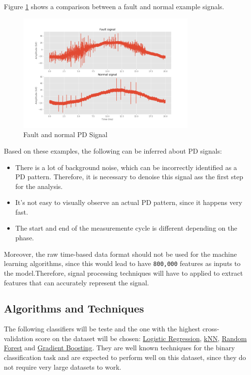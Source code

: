 \documentclass[11pt]{article}
\providecommand{\tightlist}{%
      \setlength{\itemsep}{0pt}\setlength{\parskip}{0pt}}
\begin{document}
Figure \ref{fig:pdsignal_fd} shows a comparison between a fault and normal example
signals. 

\begin{figure}[h!]
	\centering
	\includegraphics[width=0.8\textwidth]{signal_fault_normal_raw.png}
	\caption{Fault and normal PD Signal}
	\label{fig:pdsignal_fd}
\end{figure}

Based on these examples, the following can be inferred about PD signals:

\begin{itemize}
\tightlist
\item
  There is a lot of background noise, which can be incorrectly
  identified as a PD pattern. Therefore, it is necessary to denoise this
  signal ass the first step for the analysis.
\item
  It's not easy to visually observe an actual PD pattern, since it
  happens very fast.
\item
  The start and end of the measuremente cycle is different depending on
  the phase.
\end{itemize}

Moreover, the raw time-based data format should not be used for the
machine learning algorithms, since this would lead to have
\texttt{800,000} features as inputs to the model.Therefore, signal
processing techniques will have to applied to extract features that can
accurately represent the signal.



\hypertarget{algorithms-and-techniques}{%
\subsection{Algorithms and
Techniques}\label{algorithms-and-techniques}}

The following classifiers will be teste and the one with the highest
cross-validation score on the dataset will be chosen:
\href{https://scikit-learn.org/stable/modules/generated/sklearn.linear_model.LogisticRegression.html}{Logistic
Regression},
\href{https://scikit-learn.org/stable/modules/generated/sklearn.neighbors.KNeighborsClassifier.html}{kNN},
\href{https://scikit-learn.org/stable/modules/generated/sklearn.ensemble.RandomForestClassifier.html}{Random
Forest} and
\href{https://scikit-learn.org/stable/modules/generated/sklearn.ensemble.GradientBoostingClassifier.html}{Gradient
Boosting}. They are well known techniques for the binary classification
task and are expected to perform well on this dataset, since they do not
require very large datasets to work. 
\end{document}
